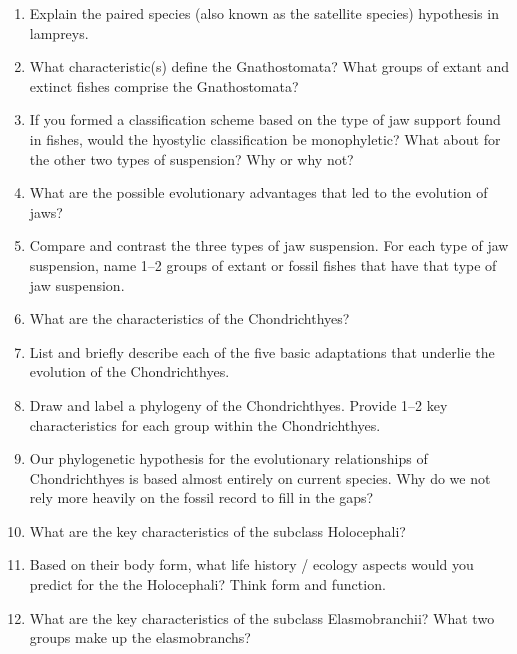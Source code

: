\documentclass[letterpaper]{tufte-handout}
\begin{document}
\begin{enumerate}
	\item Explain the paired species (also known as the satellite species) hypothesis in lampreys.  

	\item What characteristic(s) define the Gnathostomata?  What groups of extant and extinct fishes comprise the Gnathostomata?	

	\item If you formed a classification scheme based on the type of jaw support found in fishes, would the hyostylic classification be monophyletic?  What about for the other two types of suspension?  Why or why not?

	\item What are the possible evolutionary advantages that led to the evolution of jaws?

	\item Compare and contrast the three types of jaw suspension.  For each type of jaw suspension, name 1--2 groups of extant or fossil fishes that have that type of jaw suspension.

	\item What are the characteristics of the Chondrichthyes?

	\item List and briefly describe each of the five basic adaptations that underlie the evolution of the Chondrichthyes.

	\item Draw and label a phylogeny of the Chondrichthyes.  Provide 1--2 key characteristics for each group within the Chondrichthyes.

	\item Our phylogenetic hypothesis for the evolutionary relationships of Chondrichthyes is based almost entirely on current species.  Why do we not rely more heavily on the fossil record to fill in the gaps?

	\item What are the key characteristics of the subclass Holocephali?

	\item Based on their body form, what life history / ecology aspects would you predict for the the Holocephali? Think form and function.

	\item What are the key characteristics of the subclass Elasmobranchii?  What two groups make up the elasmobranchs?

\end{enumerate}
\end{document}
